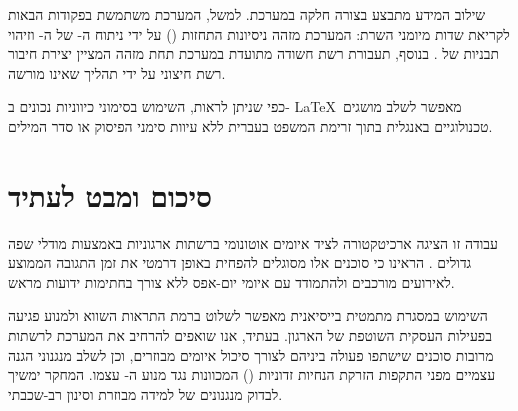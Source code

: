 \documentclass[11pt,a4paper]{article}
\begin{document}
שילוב המידע מתבצע בצורה חלקה במערכת. למשל, המערכת משתמשת בפקודות הבאות לקריאת שדות מיומני השרת:
המערכת מזהה ניסיונות התחזות () על ידי ניתוח ה- של ה- וזיהוי תבניות של . בנוסף, תעבורת רשת חשודה מתועדת במערכת  תחת מזהה  המציין יצירת חיבור רשת חיצוני על ידי תהליך שאינו מורשה.

כפי שניתן לראות, השימוש בסימוני כיווניות נכונים ב- \LaTeX\ מאפשר לשלב מושגים טכנולוגיים באנגלית בתוך זרימת המשפט בעברית ללא עיוות סימני הפיסוק או סדר המילים.

\section{סיכום ומבט לעתיד}
עבודה זו הציגה ארכיטקטורה לציד איומים אוטונומי ברשתות ארגוניות באמצעות מודלי שפה גדולים \cite{Zohar2024}. הראינו כי סוכנים אלו מסוגלים להפחית באופן דרמטי את זמן התגובה הממוצע לאירועים מורכבים ולהתמודד עם איומי יום-אפס ללא צורך בחתימות ידועות מראש.

השימוש במסגרת מתמטית בייסיאנית מאפשר לשלוט ברמת התראות השווא ולמנוע פגיעה בפעילות העסקית השוטפת של הארגון. בעתיד, אנו שואפים להרחיב את המערכת לרשתות מרובות סוכנים שישתפו פעולה ביניהם לצורך סיכול איומים מבוזרים, וכן לשלב מנגנוני הגנה עצמיים מפני התקפות הזרקת הנחיות זדוניות () המכוונות נגד מנוע ה- עצמו. המחקר ימשיך לבדוק מנגנונים של למידה מבוזרת וסינון רב-שכבתי.

\newpage
\printbibliography[title={מקורות}]
\end{document}
